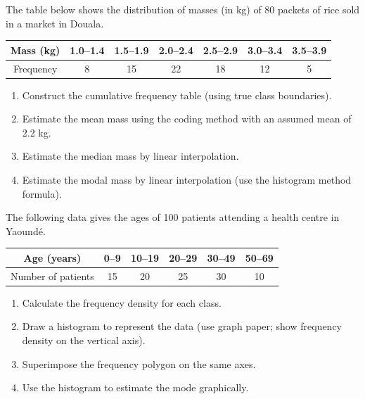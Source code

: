 \documentclass[11pt]{article}
\begin{document}
\begin{exercice}
The table below shows the distribution of masses (in kg) of 80 packets of rice sold in a market in Douala.

\begin{center}
\begin{tabular}{|c|c|c|c|c|c|c|}\hline
Mass (kg) & 1.0--1.4 & 1.5--1.9 & 2.0--2.4 & 2.5--2.9 & 3.0--3.4 & 3.5--3.9 \\ \hline
Frequency & 8 & 15 & 22 & 18 & 12 & 5 \\ \hline
\end{tabular}
\end{center}

\begin{enumerate}
\item Construct the cumulative frequency table (using true class boundaries).
\item Estimate the mean mass using the coding method with an assumed mean of 2.2 kg.
\item Estimate the median mass by linear interpolation.
\item Estimate the modal mass by linear interpolation (use the histogram method formula).
\end{enumerate}
\end{exercice}

\begin{exercice}
The following data gives the ages of 100 patients attending a health centre in Yaoundé.

\begin{center}
\begin{tabular}{|c|c|c|c|c|c|}\hline
Age (years) & 0--9 & 10--19 & 20--29 & 30--49 & 50--69 \\ \hline
Number of patients & 15 & 20 & 25 & 30 & 10 \\ \hline
\end{tabular}
\end{center}

\begin{enumerate}
\item Calculate the frequency density for each class.
\item Draw a histogram to represent the data (use graph paper; show frequency density on the vertical axis).
\item Superimpose the frequency polygon on the same axes.
\item Use the histogram to estimate the mode graphically.
\end{enumerate}
\end{exercice}
\end{document}
